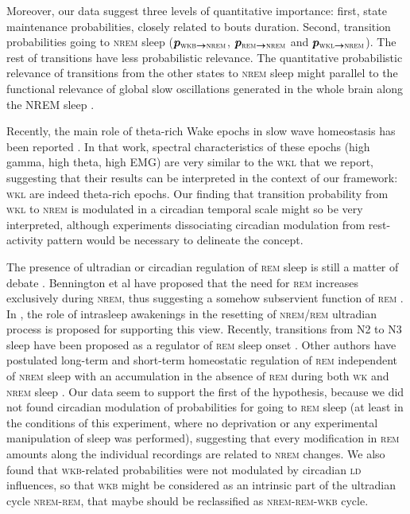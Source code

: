 \documentclass[10pt,letterpaper]{article}
\def\REM/{\textsc{rem}}
\def\NREM/{\textsc{nrem}}
\def\WK/{\textsc{wk}}
\def\WKL/{\textsc{wkl}}
\def\WKB/{\textsc{wkb}}
\def\LD/{\textsc{ld}}
\newcommand{\pp}[2]{\bm{p_{#1 \rightarrow #2}}}
\begin{document}
Moreover, our data suggest three levels of quantitative importance: first,  state maintenance probabilities, closely related to bouts duration. Second,  transition probabilities going to \NREM/ sleep ($\pp{\WKB/}{\NREM/}$, $\pp{\REM/}{\NREM/}$ and $\pp{\WKL/}{\NREM/}$). The rest of transitions have  less probabilistic relevance. The quantitative probabilistic relevance  of transitions  from the other states to \NREM/ sleep  might parallel to the functional relevance of global slow oscillations generated in the whole brain along the NREM sleep \cite{Steriade2003}. 

Recently, the main role of theta-rich Wake epochs in slow wave homeostasis has been reported \cite{vassalli2017hypocretin}. In that work, spectral characteristics of these epochs (high gamma, high theta, high EMG) are very similar to the \WKL/ that we report, suggesting that their results can be interpreted in the context of our framework: \WKL/ are indeed  theta-rich epochs. Our finding that transition probability from \WKL/ to \NREM/ is modulated in a circadian temporal scale might so be very interpreted, although experiments dissociating circadian modulation from rest-activity pattern would be necessary to delineate the concept. 



The presence of ultradian or circadian regulation of \REM/ sleep is still a matter of debate \cite{le2013theories}. Bennington et al have proposed that the need for \REM/ increases exclusively during \NREM/, thus suggesting a somehow subservient function of \REM/ \cite{Benington1994}. In \cite{Groezinger2002},  the role of intrasleep awakenings in the resetting of \NREM//\REM/ ultradian process is proposed for supporting this view. Recently, transitions from N2 to N3 sleep have been proposed as  a regulator of \REM/ sleep onset \cite{kishi2011nrem}. Other authors have postulated long-term and short-term homeostatic regulation of \REM/ independent of \NREM/ sleep with an accumulation in the absence of \REM/ during both \WK/ and \NREM/ sleep \cite{ocampo2002short}. Our data seem to support the first of the hypothesis, because  we did not found circadian modulation of probabilities for going to \REM/ sleep  (at least in the conditions of this experiment, where no deprivation or any experimental manipulation of sleep was performed), suggesting that every modification in \REM/ amounts along the individual recordings are related to \NREM/ changes. We also found that \WKB/-related probabilities were not modulated by circadian \LD/ influences, so that \WKB/ might be considered as an intrinsic part of the ultradian cycle \NREM/-\REM/, that maybe should be reclassified as \NREM/-\REM/-\WKB/ cycle. 
\end{document}
